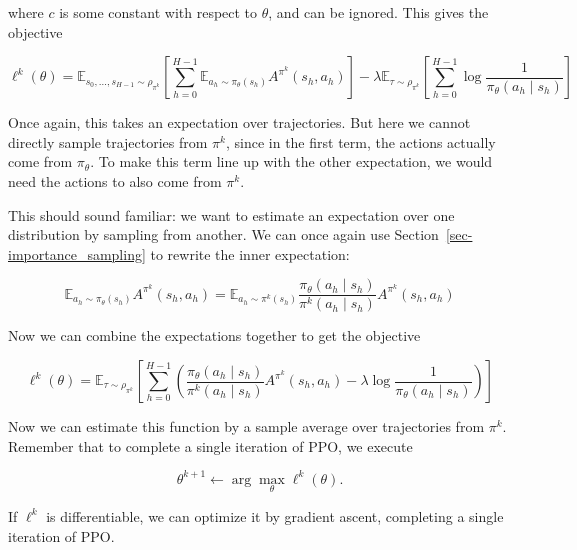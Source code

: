 \documentclass[
  letterpaper,
  DIV=11,
  numbers=noendperiod]{scrreprt}
\theoremstyle{plain}
\theoremstyle{plain}
\theoremstyle{definition}
\theoremstyle{definition}
\theoremstyle{remark}
\begin{document}
where \(c\) is some constant with respect to \(\theta\), and can be
ignored. This gives the objective

\[
\ell^k(\theta)
=
\mathbb{E}_{s_0, \dots, s_{H-1} \sim \rho_{\pi^{k}}} \left[ \sum_{h=0}^{H-1} \mathbb{E}_{a_h\sim \pi_{\theta}(s_h)} A^{\pi^{k}}(s_h, a_h) \right] - \lambda \mathbb{E}_{\tau \sim \rho_{\pi^k}} \left[ \sum_{h=0}^{H-1} \log \frac{1}{\pi_{\theta}(a_h\mid s_h)}\right]
\]

Once again, this takes an expectation over trajectories. But here we
cannot directly sample trajectories from \(\pi^k\), since in the first
term, the actions actually come from \(\pi_\theta\). To make this term
line up with the other expectation, we would need the actions to also
come from \(\pi^k\).

This should sound familiar: we want to estimate an expectation over one
distribution by sampling from another. We can once again use
Section~\ref{sec-importance_sampling} to rewrite the inner expectation:

\[
\mathbb{E}_{a_h\sim \pi_{\theta}(s_h)} A^{\pi^{k}}(s_h, a_h)
=
\mathbb{E}_{a_h\sim \pi^k(s_h)} \frac{\pi_\theta(a_h\mid s_h)}{\pi^k(a_h\mid s_h)} A^{\pi^{k}}(s_h, a_h)
\]

Now we can combine the expectations together to get the objective

\[
\ell^k(\theta) = \mathbb{E}_{\tau \sim \rho_{\pi^k}} \left[ \sum_{h=0}^{H-1} \left( \frac{\pi_\theta(a_h\mid s_h)}{\pi^k(a_h\mid s_h)} A^{\pi^k}(s_h, a_h) - \lambda \log \frac{1}{\pi_\theta(a_h\mid s_h)} \right) \right]
\]

Now we can estimate this function by a sample average over trajectories
from \(\pi^k\). Remember that to complete a single iteration of PPO, we
execute

\[
\theta^{k+1} \gets \arg\max_{\theta} \ell^k(\theta).
\]

If \(\ell^k\) is differentiable, we can optimize it by gradient ascent,
completing a single iteration of PPO.
\end{document}
